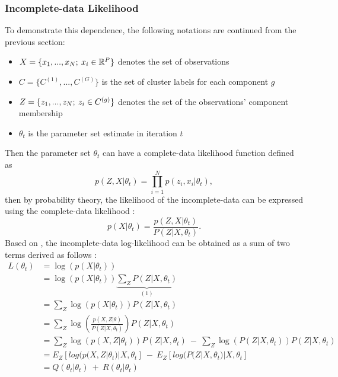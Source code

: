 \subsubsection{Incomplete-data Likelihood}
\label{sec:incompletedataLL}
To demonstrate this dependence, the following notations are continued from the previous section:
\begin{itemize}
    \item \(X=\{x_1, ..., x_N; \: x_i \in \mathbb{R}^P\}\) denotes the set of observations
    \item \(C=\{C^{(1)}, ..., C^{(G)}\}\) is the set of cluster labels for each component \(g\)
    \item \(Z=\{z_1, ..., z_N; \: z_i \in C^{(g)}\}\) denotes the set of the observations' component membership
    \item \(\theta_t\) is the parameter set estimate in iteration \(t\) 
\end{itemize}
Then the parameter set \(\theta_t\) can have a complete-data likelihood function defined as
\begin{equation}
    p(Z,X|\theta_t) = \prod_{i=1}^{N}p(z_i, x_i|\theta_t),
\end{equation}
then by probability theory, the likelihood of the incomplete-data can be expressed using the complete-data likelihood :
\begin{equation}
    p(X|\theta_t) = \frac{p(Z,X|\theta_t)}{P(Z|X,\theta_t)}.
\end{equation}
Based on , the incomplete-data log-likelihood can be obtained as a sum of two terms derived as follows :
\begin{equation*}
    \begin{aligned}
    L( \theta _{t}) & =\log( p( X|\theta _{t}))\\
     & =\log( p( X|\theta _{t}))\underbrace{\sum _{Z} P( Z|X,\theta _{t})}_{( 1)}\\
     & =\sum _{Z}\log( p( X|\theta _{t})) P( Z|X,\theta _{t})\\
     & =\sum _{Z}\log\left(\frac{p( X,Z|\theta )}{P( Z|X,\theta _{t})}\right) P( Z|X,\theta _{t})\\
     & =\sum _{Z}\log( p( X,Z|\theta _{t})) P( Z|X,\theta _{t}) \ -\ \sum _{Z}\log( P( Z|X,\theta _{t})) P( Z|X,\theta _{t})\\
     & =E_{Z}[ log( p( X,Z|\theta _{t}) |X,\theta _{t}] \ -\ E_{Z}[ log( P( Z|X,\theta _{t}) |X,\theta _{t}]\\
     & =Q( \theta _{t} |\theta _{t}) \ +\ R( \theta _{t} |\theta _{t})
    \end{aligned}
\end{equation*}

